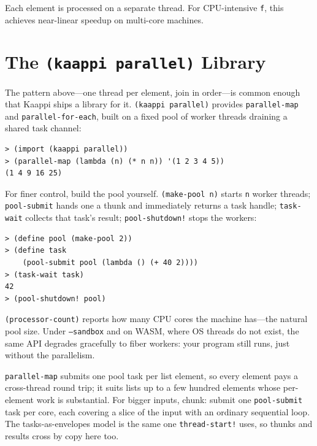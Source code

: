 Each element is processed on a separate thread. For CPU-intensive \texttt{f}, this achieves near-linear speedup on multi-core machines.

\section{The \texttt{(kaappi parallel)} Library}

The pattern above---one thread per element, join in order---is common enough that Kaappi ships a library for it. \texttt{(kaappi parallel)} provides \texttt{parallel-map} and \texttt{parallel-for-each}, built on a fixed pool of worker threads draining a shared task channel:

\begin{lstlisting}[style=repl]
> (import (kaappi parallel))
> (parallel-map (lambda (n) (* n n)) '(1 2 3 4 5))
(1 4 9 16 25)
\end{lstlisting}

For finer control, build the pool yourself. \texttt{(make-pool n)} starts \texttt{n} worker threads; \texttt{pool-submit} hands one a thunk and immediately returns a task handle; \texttt{task-wait} collects that task's result; \texttt{pool-shutdown!} stops the workers:

\begin{lstlisting}[style=repl]
> (define pool (make-pool 2))
> (define task
    (pool-submit pool (lambda () (+ 40 2))))
> (task-wait task)
42
> (pool-shutdown! pool)
\end{lstlisting}

\texttt{(processor-count)} reports how many CPU cores the machine has---the natural pool size. Under \texttt{--sandbox} and on WASM, where OS threads do not exist, the same API degrades gracefully to fiber workers: your program still runs, just without the parallelism.

\begin{note}
\texttt{parallel-map} submits one pool task per list element, so every element pays a cross-thread round trip; it suits lists up to a few hundred elements whose per-element work is substantial. For bigger inputs, chunk: submit one \texttt{pool-submit} task per core, each covering a slice of the input with an ordinary sequential loop. The tasks-as-envelopes model is the same one \texttt{thread-start!} uses, so thunks and results cross by copy here too.
\end{note}

